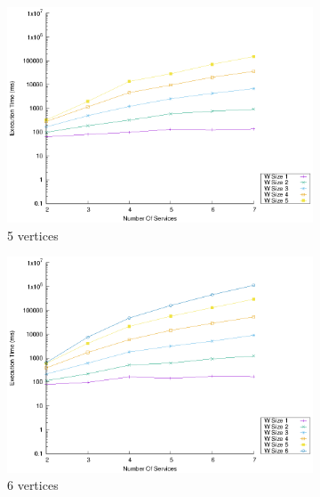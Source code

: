 \begin{figure}[!htb]
\begin{subfigure}{0.33\textwidth}
    \includegraphics[width=\textwidth]{Images/graphs/window_time_performance_n7_s7_20_100_n5}
    \caption{5 vertices}
    \label{fig:time_window_perce_average_5n}
  \end{subfigure}
  \hfill
  \begin{subfigure}{0.33\textwidth}
    \includegraphics[width=\textwidth]{Images/graphs/window_time_performance_n7_s7_20_100_n6}
    \caption{6 vertices}
    \label{fig:time_window_perce_average_6n}
  \end{subfigure}
  \begin{subfigure}{0.33\textwidth}

\end{subfigure}
\end{figure}
